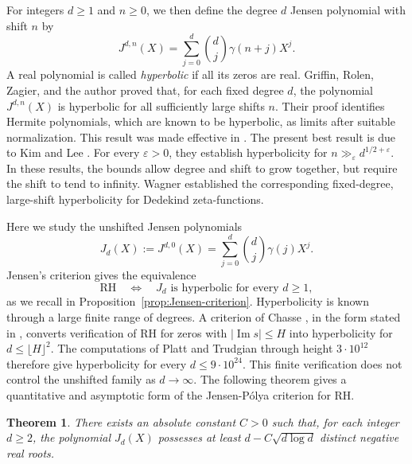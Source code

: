 \documentclass[11pt,reqno]{amsart}
\numberwithin{equation}{section}
\newtheorem{theorem}{Theorem}
\renewcommand{\Im}{\operatorname{Im}}
\begin{document}
For integers $d\ge1$ and $n\ge0$,
we then define the degree $d$ Jensen polynomial with
shift $n$ by
\begin{equation}\label{eq:shifted-J}
 J^{d,n}(X)=\sum_{j=0}^{d}\binom dj\gamma(n+j)X^j.
\end{equation}
A real polynomial is called \emph{hyperbolic} if all its zeros are real.
Griffin, Rolen, Zagier, and the author \cite{GORZ} proved that,
for each fixed degree $d$, the polynomial $J^{d,n}(X)$ is
hyperbolic for all sufficiently large shifts $n$. Their proof
identifies Hermite polynomials, which are known to be hyperbolic, as limits after suitable
normalization. This result was made effective in
\cite{GORTTW}. The present best result is due to Kim and Lee \cite{KL}. 
For every $\varepsilon>0$, they establish hyperbolicity for
$n\gg_{\varepsilon} d^{1/2+\varepsilon}$. In these results, the bounds allow degree and shift
to grow together, but require the shift to tend to infinity.
Wagner \cite[Theorem~1.3 and Corollary~1.6]{Wagner} established
the corresponding fixed-degree, large-shift hyperbolicity for
Dedekind zeta-functions.

Here we study the unshifted
Jensen polynomials 
\begin{equation}\label{eq:J-definition}
 J_d(X):=J^{d,0}(X)=\sum_{j=0}^{d}\binom dj\gamma(j)X^j.
\end{equation}
Jensen's criterion gives the equivalence
\begin{equation}\label{eq:RH-equivalence}
 \mathrm{RH}\quad\Longleftrightarrow\quad
 J_d\text{ is hyperbolic for every }d\ge1,
\end{equation}
as we recall in Proposition~\ref{prop:Jensen-criterion}. Hyperbolicity
is known through a large finite range of degrees. A criterion of
Chasse \cite{Chasse}, in the form stated in
\cite[Theorem~1.2]{GORTTW}, converts verification of RH for zeros
with $|\Im s|\le H$ into hyperbolicity for $d\le\lfloor H\rfloor^2$.
The computations of Platt and Trudgian \cite{PT} through height
$3\cdot10^{12}$ therefore give hyperbolicity for every
$d\le9\cdot10^{24}$. This finite verification does not control the unshifted family as $d\to\infty$.
The following theorem gives a quantitative and asymptotic form of the Jensen-P\'olya criterion for RH.

\begin{theorem}\label{thm:main}
There exists an absolute constant $C>0$ such that, for each integer $d\ge 2$, the polynomial $J_d(X)$ possesses at least $d - C\sqrt{d\log d}$ distinct negative real roots.
\end{theorem}
\end{document}
